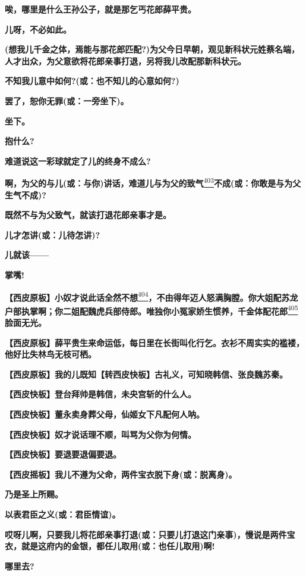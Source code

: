 \textbf{唉，哪里是什么王孙公子，就是那乞丐花郎薛平贵。}

\textbf{儿呀，不必如此。}

\textbf{(想我儿千金之体，焉能与那花郎匹配?)为父今日早朝，观见新科状元姓蔡名端，人才出众，为父意欲将花郎亲事打退，另将我儿改配那新科状元。}

\textbf{不知我儿意中如何?(或：也不知儿的心意如何?)}

\textbf{罢了，恕你无罪(或：一旁坐下)。}

\textbf{坐下。}

\textbf{抱什么?}

\textbf{难道说这一彩球就定了儿的终身不成么?}

\textbf{啊，为父的与儿(或：与你)讲话，难道儿与为父的致气}\protect\hyperlink{fn403}{\textsuperscript{403}}\textbf{不成(或：你敢是与为父生气不成)?}

\textbf{既然不与为父致气，就该打退花郎亲事才是。}

\textbf{儿才怎讲(或：儿待怎讲)?}

\textbf{儿就该------}

\textbf{掌嘴!}

\textbf{【西皮原板】小奴才说此话全然不想}\protect\hyperlink{fn404}{\textsuperscript{404}}\textbf{，不由得年迈人怒满胸膛。你大姐配苏龙户部执掌啊；你二姐配魏虎兵部侍郎。唯独你小冤家娇生惯养，千金体配花郎}\protect\hyperlink{fn405}{\textsuperscript{405}}\textbf{脸面无光。}

\textbf{【西皮原板】薛平贵生来命运低，每日里在长街叫化行乞。衣衫不周实实的褴褛，他好比失林鸟无枝可栖。}

\textbf{【西皮原板】我的儿既知【转西皮快板】古礼义，可知晓韩信、张良魏苏秦。}

\textbf{【西皮快板】登台拜帅是韩信，未央宫斩的什么人。}

\textbf{【西皮快板】董永卖身葬父母，仙姬女下凡配何人呐。}

\textbf{【西皮快板】奴才说话理不顺，叫骂为父你为何情。}

\textbf{【西皮快板】要退要退偏要退。}

\textbf{【西皮摇板】我儿不遵为父命，两件宝衣脱下身(或：脱离身)。}

\textbf{乃是圣上所赐。}

\textbf{以表君臣之义(或：君臣情谊)。}

\textbf{哎呀儿啊，只要我儿将花郎亲事打退(或：只要儿打退这门亲事)，慢说是两件宝衣，就是这府内的金银，都任儿取用(或：也任儿取用)啊!}

\textbf{哪里去?}

